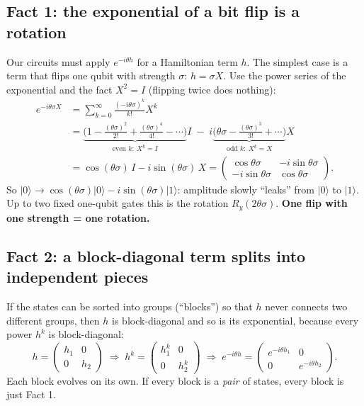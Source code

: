 \documentclass[11pt]{article}
\providecommand{\ket}[1]{|#1\rangle}
\newcommand{\Ry}{R_y}
\begin{document}
\subsection{Fact 1: the exponential of a bit flip is a rotation}

Our circuits must apply $e^{-i\theta h}$ for a Hamiltonian term $h$.  The simplest case is a term that flips
one qubit with strength $\sigma$: $h=\sigma X$.  Use the power series of the exponential and the fact
$X^2=I$ (flipping twice does nothing):
\begin{align*}
e^{-i\theta\sigma X}
&= \sum_{k=0}^{\infty}\frac{(-i\theta\sigma)^k}{k!}X^k\\
&= \underbrace{\Big(1-\frac{(\theta\sigma)^2}{2!}+\frac{(\theta\sigma)^4}{4!}-\cdots\Big)}_{\text{even }k:\ X^k=I}I
   \;-\;i\underbrace{\Big(\theta\sigma-\frac{(\theta\sigma)^3}{3!}+\cdots\Big)}_{\text{odd }k:\ X^k=X}X\\
&= \cos(\theta\sigma)\,I-i\sin(\theta\sigma)\,X
 =\begin{pmatrix}\cos\theta\sigma & -i\sin\theta\sigma\\ -i\sin\theta\sigma & \cos\theta\sigma\end{pmatrix}.
\end{align*}
So $\ket0\to\cos(\theta\sigma)\ket0-i\sin(\theta\sigma)\ket1$: amplitude slowly ``leaks'' from $\ket0$ to
$\ket1$.  Up to two fixed one-qubit gates this is the rotation $\Ry(2\theta\sigma)$.  \textbf{One flip with
one strength = one rotation.}

\subsection{Fact 2: a block-diagonal term splits into independent pieces}

If the states can be sorted into groups (``blocks'') so that $h$ never connects two different groups, then
$h$ is block-diagonal and so is its exponential, because every power $h^k$ is block-diagonal:
\[
h=\begin{pmatrix}h_1&0\\0&h_2\end{pmatrix}
\;\Rightarrow\;
h^k=\begin{pmatrix}h_1^k&0\\0&h_2^k\end{pmatrix}
\;\Rightarrow\;
e^{-i\theta h}=\begin{pmatrix}e^{-i\theta h_1}&0\\0&e^{-i\theta h_2}\end{pmatrix}.
\]
Each block evolves on its own.  If every block is a \emph{pair} of states, every block is just Fact 1.
\end{document}
